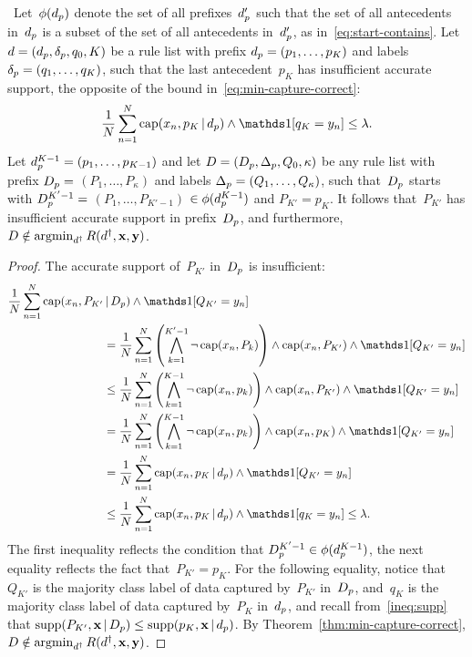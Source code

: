 \begin{arxiv}
\begin{proposition}
\label{prop:min-capture-correct}
~Let~$\phi(d_p)$ denote the set of all
prefixes~$d_p'$ such that
the set of all antecedents in~$d_p$ is a subset of
the set of all antecedents in~$d_p'$,
as in~\eqref{eq:start-contains}.
%
Let ${{d} = (d_p, \delta_p, q_0, K)}$ be a rule list
with prefix ${d_p = (p_1, \dots, p_{K})}$
and labels ${\delta_p = (q_1, \dots, q_{K})}$, such that
the last antecedent~$p_{K}$ has insufficient accurate support,
\ie the opposite of the bound in~\eqref{eq:min-capture-correct}:
\begin{align}
\frac{1}{N} \sum_{n=1}^N \Cap(x_n, p_K \given \Prefix) \wedge \one [ q_K = y_n ]
\le \Reg.
\end{align}
%
Let ${d_p^{K-1} = (p_1, \dots, p_{K-1})}$
and let ${{D} = (D_p, \Delta_p, Q_0, \kappa)}$
be any rule list with prefix ${D_p =}$ ${(P_1, \dots, P_{\kappa})}$
and labels ${\Delta_p = (Q_1, \dots, Q_{\kappa})}$,
such that~$D_p$ starts with ${D_p^{K'-1} =}$
${(P_1, \dots, P_{K'-1})}$ ${\in \phi(d_p^{K-1})}$
and ${P_{K'} = p_{K}}$.
%
It follows that~$P_{K'}$ has insufficient accurate support in
prefix~$D_p$, and furthermore,
${{D} \notin \operatorname*{argmin}_{{d}^\dagger} R({d}^\dagger, \mathbf{x}, \mathbf{y})}$.
\end{proposition}

\begin{proof}
The accurate support of~$P_{K'}$ in~$D_p$ is insufficient:
\begin{align}
\frac{1}{N} \sum_{n=1}^N \Cap(x_n, P_{K'} &\given \PrefixB) \wedge \one [ Q_{K'} = y_n ] \nn \\
&= \frac{1}{N} \sum_{n=1}^N \left( \bigwedge_{k=1}^{K'-1} \neg\, \Cap(x_n, P_k) \right)
   \wedge \Cap(x_n, P_{K'}) \wedge \one [ Q_{K'} = y_n ] \nn \\
&\le \frac{1}{N} \sum_{n=1}^N \left( \bigwedge_{k=1}^{K-1} \neg\, \Cap(x_n, p_k) \right)
   \wedge \Cap(x_n, P_{K'}) \wedge \one [ Q_{K'} = y_n ] \nn \\
&= \frac{1}{N} \sum_{n=1}^N \left( \bigwedge_{k=1}^{K-1} \neg\, \Cap(x_n, p_k) \right)
   \wedge \Cap(x_n, p_K) \wedge \one [ Q_{K'} = y_n ] \nn \\
&= \frac{1}{N} \sum_{n=1}^N \Cap(x_n, p_K \given \Prefix) \wedge \one [ Q_{K'} = y_n ] \nn \\
&\le \frac{1}{N} \sum_{n=1}^N \Cap(x_n, p_K \given \Prefix) \wedge \one [ q_{K} = y_n ]
\le \Reg.
\end{align}
The first inequality reflects the condition that
${D_p^{K'-1} \in \phi(d_p^{K-1})}$,
the next equality reflects the fact that~${P_{K'} = p_K}$.
%
For the following equality, notice that~$Q_{K'}$ is the majority
class label of data captured by~$P_{K'}$ in~$D_p$, and~$q_K$
is the majority class label of data captured by~$P_K$ in~$d_p$,
and recall from~\eqref{ineq:supp} that
${\textnormal{supp}(P_{K'}, \mathbf{x} \,|\, D_p) \le \textnormal{supp}(p_{K}, \mathbf{x} \,|\, d_p)}$.
%
By Theorem~\ref{thm:min-capture-correct},
${{D} \notin \operatorname*{argmin}_{{d}^\dagger} R({d}^\dagger, \mathbf{x}, \mathbf{y})}$.
\end{proof}


\end{arxiv}
